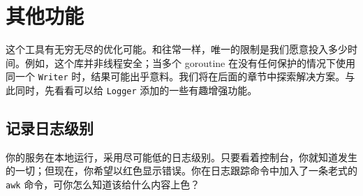 \section{其他功能}

这个工具有无穷无尽的优化可能。和往常一样，唯一的限制是我们愿意投入多少时间。例如，这个库并非线程安全；当多个 goroutine 在没有任何保护的情况下使用同一个 \texttt{Writer} 时，结果可能出乎意料。我们将在后面的章节中探索解决方案。与此同时，先看看可以给 \texttt{Logger} 添加的一些有趣增强功能。

\subsection{记录日志级别}

你的服务在本地运行，采用尽可能低的日志级别。只要看着控制台，你就知道发生的一切；但现在，你希望以红色显示错误。你在日志跟踪命令中加入了一条老式的 \texttt{awk} 命令，可你怎么知道该给什么内容上色？
